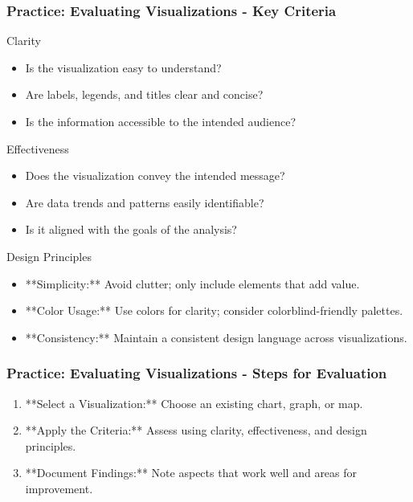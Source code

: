 \documentclass[aspectratio=169]{beamer}
\begin{document}
\begin{frame}[fragile]
    \frametitle{Practice: Evaluating Visualizations - Key Criteria}
    \begin{block}{Clarity}
        \begin{itemize}
            \item Is the visualization easy to understand?
            \item Are labels, legends, and titles clear and concise?
            \item Is the information accessible to the intended audience?
        \end{itemize}
    \end{block}
    
    \begin{block}{Effectiveness}
        \begin{itemize}
            \item Does the visualization convey the intended message?
            \item Are data trends and patterns easily identifiable?
            \item Is it aligned with the goals of the analysis?
        \end{itemize}
    \end{block}
    
    \begin{block}{Design Principles}
        \begin{itemize}
            \item **Simplicity:** Avoid clutter; only include elements that add value.
            \item **Color Usage:** Use colors for clarity; consider colorblind-friendly palettes.
            \item **Consistency:** Maintain a consistent design language across visualizations.
        \end{itemize}
    \end{block}
\end{frame}

\begin{frame}[fragile]
    \frametitle{Practice: Evaluating Visualizations - Steps for Evaluation}
    \begin{enumerate}
        \item **Select a Visualization:** Choose an existing chart, graph, or map.
        \item **Apply the Criteria:** Assess using clarity, effectiveness, and design principles.
        \item **Document Findings:** Note aspects that work well and areas for improvement.
    \end{enumerate}
\end{frame}
\end{document}
